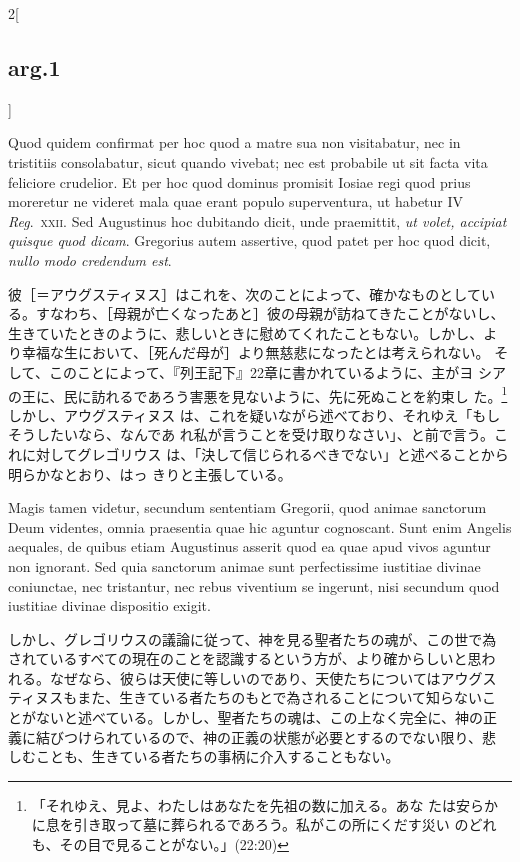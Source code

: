\documentclass[paper=a4paper,fontsize=10pt,jafontsize=9pt,titlepage]{jlreq}
\begin{document}
\begin{paracol}{2}[\subsection{arg.1}]
\switchcolumn*

Quod quidem confirmat per hoc quod a matre sua non visitabatur, nec in
tristitiis consolabatur, sicut quando vivebat; nec est probabile ut
sit facta vita feliciore crudelior. Et per hoc quod dominus promisit
Iosiae regi quod prius moreretur ne videret mala quae erant populo
superventura, ut habetur IV {\itshape Reg}.~{\scshape xxii}. Sed Augustinus hoc
dubitando dicit, unde praemittit, {\itshape ut volet, accipiat quisque quod
dicam}. Gregorius autem assertive, quod patet per hoc quod dicit, {\itshape
nullo modo credendum est}.

\switchcolumn

彼［＝アウグスティヌス］はこれを、次のことによって、確かなものとしてい
る。すなわち、［母親が亡くなったあと］彼の母親が訪ねてきたことがないし、
生きていたときのように、悲しいときに慰めてくれたこともない。しかし、よ
り幸福な生において、［死んだ母が］より無慈悲になったとは考えられない。
そして、このことによって、『列王記下』22章に書かれているように、主がヨ
シアの王に、民に訪れるであろう害悪を見ないように、先に死ぬことを約束し
た。\footnote{「それゆえ、見よ、わたしはあなたを先祖の数に加える。あな
たは安らかに息を引き取って墓に葬られるであろう。私がこの所にくだす災い
のどれも、その目で見ることがない。」(22:20)} しかし、アウグスティヌス
は、これを疑いながら述べており、それゆえ「もしそうしたいなら、なんであ
れ私が言うことを受け取りなさい」、と前で言う。これに対してグレゴリウス
は、「決して信じられるべきでない」と述べることから明らかなとおり、はっ
きりと主張している。

\switchcolumn*

Magis tamen videtur, secundum sententiam Gregorii, quod animae
sanctorum Deum videntes, omnia praesentia quae hic aguntur
cognoscant. Sunt enim Angelis aequales, de quibus etiam Augustinus
asserit quod ea quae apud vivos aguntur non ignorant. Sed quia
sanctorum animae sunt perfectissime iustitiae divinae coniunctae, nec
tristantur, nec rebus viventium se ingerunt, nisi secundum quod
iustitiae divinae dispositio exigit.

\switchcolumn

しかし、グレゴリウスの議論に従って、神を見る聖者たちの魂が、この世で為
されているすべての現在のことを認識するという方が、より確からしいと思わ
れる。なぜなら、彼らは天使に等しいのであり、天使たちについてはアウグス
ティヌスもまた、生きている者たちのもとで為されることについて知らないこ
とがないと述べている。しかし、聖者たちの魂は、この上なく完全に、神の正
義に結びつけられているので、神の正義の状態が必要とするのでない限り、悲
しむことも、生きている者たちの事柄に介入することもない。


\end{paracol}
\end{document}
